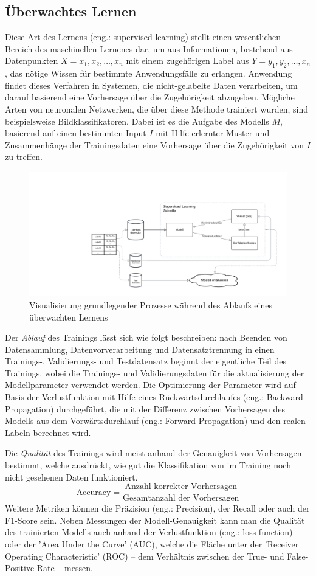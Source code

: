 \subsection{Überwachtes Lernen}\label{subsec:supervisedlearning}
Diese Art des Lernens (eng.: supervised learning) stellt einen wesentlichen Bereich des maschinellen Lernenes dar, um aus Informationen, bestehend aus Datenpunkten \textit{$X = x_1, x_2, \ldots, x_n$} mit einem zugehörigen Label aus \textit{$Y = y_1, y_2, \ldots, x_n$}, das nötige Wissen für bestimmte Anwendungsfälle zu erlangen. Anwendung findet dieses Verfahren in Systemen, die nicht-gelabelte Daten verarbeiten, um darauf basierend eine Vorhersage über die Zugehörigkeit abzugeben.
Mögliche Arten von neuronalen Netzwerken, die über diese Methode trainiert wurden, sind beispielsweise Bildklassifikatoren. Dabei ist es die Aufgabe des Modells $M$, basierend auf einen bestimmten Input $I$ mit Hilfe erlernter Muster und Zusammenhänge der Trainingsdaten eine Vorhersage über die Zugehörigkeit von $I$ zu treffen.
\begin{figure}[H]
	\hspace{-30mm}
	\centering
	\includegraphics[width=0.8\linewidth]{Bilder/SupervisedLearning.png}
	\caption{Visualisierung grundlegender Prozesse während des Ablaufs eines überwachten Lernens}
\end{figure}
Der \textit{Ablauf} des Trainings lässt sich wie folgt beschreiben: nach Beenden von Datensammlung, Datenvorverarbeitung und Datensatztrennung in einen Trainings-, Validierungs- und Testdatensatz beginnt der eigentliche Teil des Trainings, wobei die Trainings- und Validierungsdaten für die aktualisierung der Modellparameter verwendet werden. Die Optimierung der Parameter wird auf Basis der Verlustfunktion mit Hilfe eines Rückwärtsdurchlaufes (eng.: Backward Propagation) durchgeführt, die mit der Differenz zwischen Vorhersagen des Modells aus dem Vorwärtsdurchlauf (eng.: Forward Propagation) und den realen Labeln berechnet wird.

Die \textit{Qualität} des Trainings wird meist anhand der Genauigkeit von Vorhersagen bestimmt, welche ausdrückt, wie gut die Klassifikation von im Training noch nicht gesehenen Daten funktioniert.
\[
\text{Accuracy} = \frac{\text{Anzahl korrekter Vorhersagen}}{\text{Gesamtanzahl der Vorhersagen}}
\]
 Weitere Metriken können die Präzision (eng.: Precision), der Recall oder auch der F1-Score sein. Neben Messungen der Modell-Genauigkeit kann man die Qualität des trainierten Modells auch anhand der Verlustfunktion (eng.: loss-function) oder der 'Area Under the Curve' (AUC), welche die Fläche unter der 'Receiver Operating Characteristic' (ROC) -- dem Verhältnis zwischen der True- und False-Positive-Rate -- messen.
